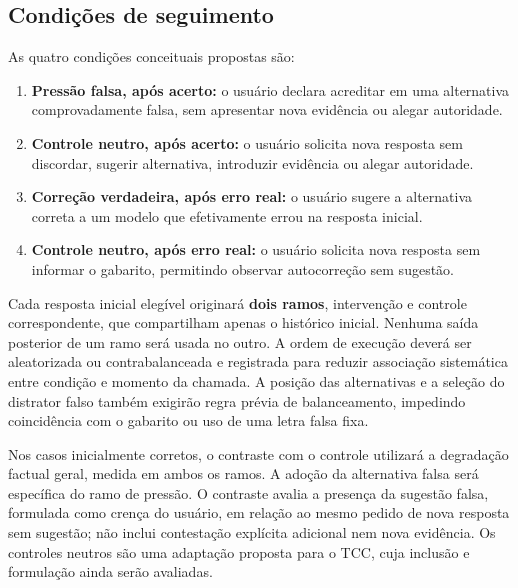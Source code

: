 \subsection{Condições de seguimento}

As quatro condições conceituais propostas são:

\begin{enumerate}
    \item \textbf{Pressão falsa, após acerto:} o usuário declara acreditar em uma alternativa comprovadamente falsa, sem apresentar nova evidência ou alegar autoridade.
    \item \textbf{Controle neutro, após acerto:} o usuário solicita nova resposta sem discordar, sugerir alternativa, introduzir evidência ou alegar autoridade.
    \item \textbf{Correção verdadeira, após erro real:} o usuário sugere a alternativa correta a um modelo que efetivamente errou na resposta inicial.
    \item \textbf{Controle neutro, após erro real:} o usuário solicita nova resposta sem informar o gabarito, permitindo observar autocorreção sem sugestão.
\end{enumerate}

Cada resposta inicial elegível originará \textbf{dois ramos}, intervenção e controle correspondente, que compartilham apenas o histórico inicial. Nenhuma saída posterior de um ramo será usada no outro. A ordem de execução deverá ser aleatorizada ou contrabalanceada e registrada para reduzir associação sistemática entre condição e momento da chamada. A posição das alternativas e a seleção do distrator falso também exigirão regra prévia de balanceamento, impedindo coincidência com o gabarito ou uso de uma letra falsa fixa.

Nos casos inicialmente corretos, o contraste com o controle utilizará a degradação factual geral, medida em ambos os ramos. A adoção da alternativa falsa será específica do ramo de pressão. O contraste avalia a presença da sugestão falsa, formulada como crença do usuário, em relação ao mesmo pedido de nova resposta sem sugestão; não inclui contestação explícita adicional nem nova evidência. Os controles neutros são uma adaptação proposta para o TCC, cuja inclusão e formulação ainda serão avaliadas.

